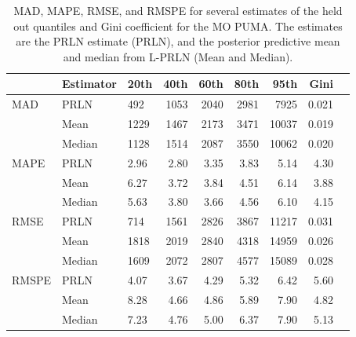 \documentclass[12pt]{article}
\begin{document}
\begin{table}[ht]
  \centering
  \begin{tabular}{lllrrrrrr}
    \hline
            & Estimator & 20th & 40th & 60th & 80th & 95th & Gini \\
    \hline
    MAD     & PRLN         & 492   & 1053  & 2040 & 2981 & 7925  & 0.021 \\
            & Mean         & 1229  & 1467  & 2173 & 3471 & 10037 & 0.019 \\
            & Median       & 1128  & 1514  & 2087 & 3550 & 10062 & 0.020 \\
    \hline
    MAPE    & PRLN         & 2.96  & 2.80  & 3.35 & 3.83 & 5.14  & 4.30 \\
            & Mean         & 6.27  & 3.72  & 3.84 & 4.51 & 6.14  & 3.88 \\
            & Median       & 5.63  & 3.80  & 3.66 & 4.56 & 6.10  & 4.15 \\
    \hline
    RMSE    & PRLN         & 714   & 1561  & 2826 & 3867 & 11217 & 0.031 \\
            & Mean         & 1818  & 2019  & 2840 & 4318 & 14959 & 0.026 \\
            & Median       & 1609  & 2072  & 2807 & 4577 & 15089 & 0.028 \\
    \hline
    RMSPE   & PRLN         & 4.07  & 3.67  & 4.29 & 5.32 & 6.42  & 5.60 \\
            & Mean         & 8.28  & 4.66  & 4.86 & 5.89 & 7.90  & 4.82 \\
            & Median       & 7.23  & 4.76  & 5.00 & 6.37 & 7.90  & 5.13 \\
    \hline
  \end{tabular}
  \caption{MAD, MAPE, RMSE, and RMSPE for several estimates of the held out quantiles and Gini coefficient for the MO PUMA. The estimates are the PRLN estimate (PRLN), and the posterior predictive mean and median from L-PRLN (Mean and Median).}
  \label{tab:mo.metric}
\end{table}
\end{document}
